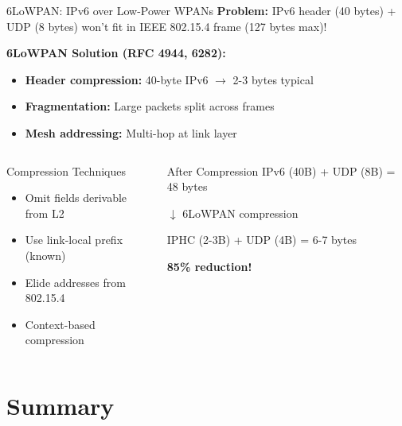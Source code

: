 \documentclass[aspectratio=169,11pt]{beamer}
\begin{document}
\begin{frame}{6LoWPAN: IPv6 over Low-Power WPANs}
    \textbf{Problem:} IPv6 header (40 bytes) + UDP (8 bytes) won't fit in IEEE 802.15.4 frame (127 bytes max)!
    
    \vspace{0.3cm}
    \textbf{6LoWPAN Solution (RFC 4944, 6282):}
    \begin{itemize}
        \item \textbf{Header compression:} 40-byte IPv6 $\rightarrow$ 2-3 bytes typical
        \item \textbf{Fragmentation:} Large packets split across frames
        \item \textbf{Mesh addressing:} Multi-hop at link layer
    \end{itemize}
    
    \vspace{0.3cm}
    \begin{columns}
        \begin{exampleblock}{Compression Techniques}
            \begin{itemize}
                \item Omit fields derivable from L2
                \item Use link-local prefix (known)
                \item Elide addresses from 802.15.4
                \item Context-based compression
            \end{itemize}
        \end{exampleblock}
        
        \begin{alertblock}{After Compression}
            IPv6 (40B) + UDP (8B) = 48 bytes
            
            $\downarrow$ 6LoWPAN compression
            
            IPHC (2-3B) + UDP (4B) = 6-7 bytes
            
            \textbf{85\% reduction!}
        \end{alertblock}
    \end{columns}
\end{frame}

\section{Summary}
\end{document}
